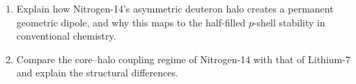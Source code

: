 \begin{exercisebox}
\begin{enumerate}
    \item Explain how Nitrogen-14's asymmetric deuteron halo creates a permanent geometric dipole, and why this maps to the half-filled $p$-shell stability in conventional chemistry.
    \item Compare the core--halo coupling regime of Nitrogen-14 with that of Lithium-7 and explain the structural differences.
\end{enumerate}
\end{exercisebox}

